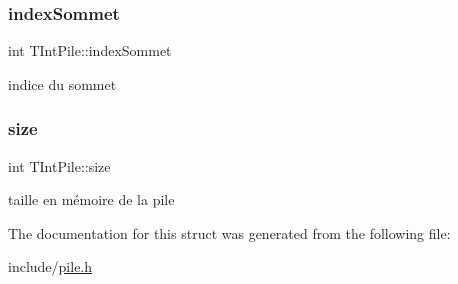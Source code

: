 \subsubsection{\texorpdfstring{index\+Sommet}{indexSommet}}
{\footnotesize\ttfamily int T\+Int\+Pile\+::index\+Sommet}

indice du sommet \mbox{\label{structTIntPile_a69b5112feaa16a029b4a86ec1130dec2}} 
\subsubsection{\texorpdfstring{size}{size}}
{\footnotesize\ttfamily int T\+Int\+Pile\+::size}

taille en mémoire de la pile 

The documentation for this struct was generated from the following file\+:\begin{DoxyCompactItemize}
\item 
include/\hyperlink{pile_8h}{pile.\+h}\end{DoxyCompactItemize}

